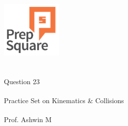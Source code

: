 \documentclass{beamer}
\begin{document}
\begin{center}
\ \\ \ \\
\includegraphics[width=30mm]{Logo-final.png} \\
\ \\ \ \\ 
{\huge Question 23 \\ \ \\ }
{\Large
Practice Set on Kinematics \& Collisions
}
{\large \ \\ \ \\ Prof. Ashwin M }
\end{center}
\end{document}
